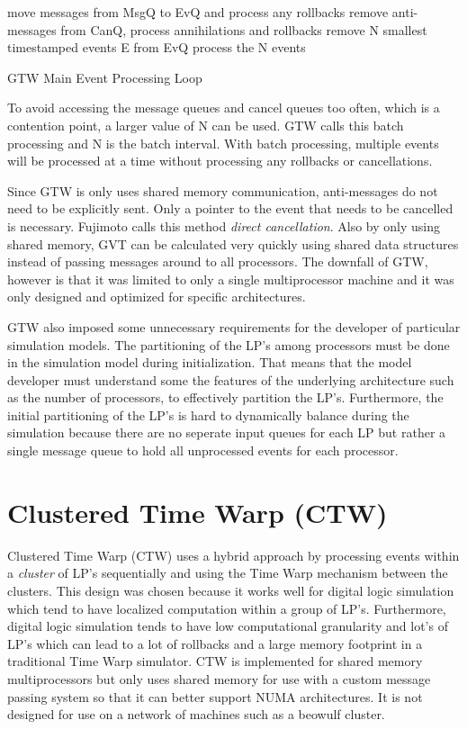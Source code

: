 \documentclass[11pt]{book}
\begin{document}
\begin{algorithm}
\DontPrintSemicolon
\SetAlgoVlined
     {
        move messages from MsgQ to EvQ and process any rollbacks\;
        remove anti-messages from CanQ, process annihilations and rollbacks\;
        remove N smallest timestamped events E from EvQ\;
        process the N events\;
    }
\caption{GTW Main Event Processing Loop\cite{das-94}\cite{fujimoto-94}\label{gtw_processing}}
\end{algorithm}

\noindent
To avoid accessing the message queues and cancel queues too often, which is a contention point,
a larger value of N can be used. GTW calls this batch processing and N is the batch interval.
With batch processing, multiple events will be processed at a time without processing any
rollbacks or cancellations.

Since GTW is only uses shared memory communication, anti-messages do not need to be explicitly
sent. Only a pointer to the event that needs to be cancelled is necessary. Fujimoto calls
this method \emph{direct cancellation}. Also by only using shared memory, GVT can be calculated
very quickly using shared data structures instead of passing messages around to all processors.
The downfall of GTW, however is that it was limited to only a single multiprocessor machine and
it was only designed and optimized for specific architectures.

GTW also imposed some unnecessary requirements for the developer of particular simulation
models. The partitioning of the LP's among processors must be done in the simulation model
during initialization. That means that the model developer must understand some the features of
the underlying architecture such as the number of processors, to effectively partition the
LP's. Furthermore, the initial partitioning of the LP's is hard to dynamically balance during
the simulation because there are no seperate input queues for each LP but rather a single
message queue to hold all unprocessed events for each processor.

\section{Clustered Time Warp (CTW)}

Clustered Time Warp\cite{avril-95} (CTW) uses a hybrid approach by processing events within
a \emph{cluster} of LP's sequentially and using the Time Warp mechanism between the clusters.
This design was chosen because it works well for digital logic simulation which tend to have
localized computation within a group of LP's. Furthermore, digital logic simulation tends to
have low computational granularity and lot's of LP's which can lead to a lot of rollbacks
and a large memory footprint in a traditional Time Warp simulator. CTW is implemented for
shared memory multiprocessors but only uses shared memory for use with a custom message passing
system so that it can better support NUMA architectures. It is not designed for use on a
network of machines such as a beowulf cluster.
\end{document}
